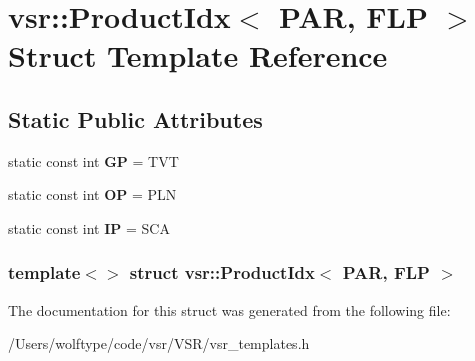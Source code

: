 \hypertarget{structvsr_1_1_product_idx_3_01_p_a_r_00_01_f_l_p_01_4}{\section{vsr\-:\-:Product\-Idx$<$ P\-A\-R, F\-L\-P $>$ Struct Template Reference}
\label{structvsr_1_1_product_idx_3_01_p_a_r_00_01_f_l_p_01_4}
}
\subsection*{Static Public Attributes}
\begin{DoxyCompactItemize}
\item 
\hypertarget{structvsr_1_1_product_idx_3_01_p_a_r_00_01_f_l_p_01_4_ac9e1b642870cf90665badac913cad849}{static const int {\bfseries G\-P} = T\-V\-T}\label{structvsr_1_1_product_idx_3_01_p_a_r_00_01_f_l_p_01_4_ac9e1b642870cf90665badac913cad849}

\item 
\hypertarget{structvsr_1_1_product_idx_3_01_p_a_r_00_01_f_l_p_01_4_a6eae5b3fa14b33ceb0769fc99d7f7516}{static const int {\bfseries O\-P} = P\-L\-N}\label{structvsr_1_1_product_idx_3_01_p_a_r_00_01_f_l_p_01_4_a6eae5b3fa14b33ceb0769fc99d7f7516}

\item 
\hypertarget{structvsr_1_1_product_idx_3_01_p_a_r_00_01_f_l_p_01_4_ad0e9d33dd56386acb610513c213fec5c}{static const int {\bfseries I\-P} = S\-C\-A}\label{structvsr_1_1_product_idx_3_01_p_a_r_00_01_f_l_p_01_4_ad0e9d33dd56386acb610513c213fec5c}

\end{DoxyCompactItemize}
\subsubsection*{template$<$$>$ struct vsr\-::\-Product\-Idx$<$ P\-A\-R, F\-L\-P $>$}



The documentation for this struct was generated from the following file\-:\begin{DoxyCompactItemize}
\item 
/\-Users/wolftype/code/vsr/\-V\-S\-R/vsr\-\_\-templates.\-h\end{DoxyCompactItemize}
